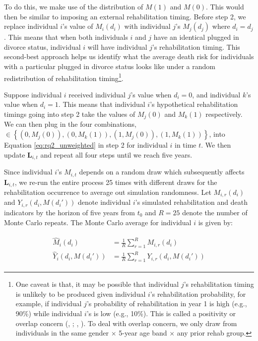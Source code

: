 \documentclass[a4paper,12pt]{article}
\theoremstyle{plain}
\theoremstyle{definition}
\theoremstyle{TheoremNum}
\theoremstyle{CorollaryNum}
\theoremstyle{PropositionNum}
\theoremstyle{TheoremNum}
\begin{document}
To do this, we make use of the distribution of $M(1)$ and $M(0)$. This would then be similar to imposing an external rehabilitation timing. Before step 2, we replace individual $i$'s value of $M_i(d_i)$ with individual $j$'s $M_j(d_j)$ where $d_i = d_j$. This means that when both individuals $i$ and $j$ have an identical plugged in divorce status, individual $i$ will have individual $j$'s rehabilitation timing. This second-best approach helps us identify what the average death risk for individuals with a particular plugged in divorce status looks like under a random redistribution of rehabilitation timing\footnote{One caveat is that, it may be possible that individual $j$'s rehabilitation timing is unlikely to be produced given individual $i$'s rehabilitation probability, for example, if individual $j$'s probability of rehabilitation in year 1 is high (e.g., 90\%) while individual $i$'s is low (e.g., 10\%). This is called a positivity or overlap concern (\citeauthor*{vanderweele2014effect}, \citeyear{vanderweele2014effect}; \citeauthor*{petersen2012diagnosing}, \citeyear{petersen2012diagnosing}). To deal with overlap concern, we only draw from individuals in the same gender $\times$ 5-year age band $\times$ any prior rehab group.}.

Suppose individual $i$ received individual $j$'s value when $d_i = 0$, and individual $k$'s value when $d_i = 1$. This means that individual $i$'s hypothetical rehabilitation timings going into step 2 take the values of $M_j(0)$ and $M_k(1)$ respectively. We can then plug in the four combinations, $\in \left\{(0,M_{j}(0)), (0,M_{k}(1)), (1, M_{j}(0)), (1, M_{k}(1))\right\}$, into Equation \ref{eq:rq2_unweighted} in step 2 for individual $i$ in time $t$. We then update $\mathbf{L}_{i,t}$  and repeat all four steps until we reach five years. 

Since individual $i$'s $M_{i,t}$ depends on a random draw which subsequently affects $\mathbf{L}_{i,t}$, we re-run the entire process 25 times with different draws for the rehabilitation occurrence to average out simulation randomness. Let $M_{i,r}(d_i)$ and $Y_{i,r}(d_i,M(d_i'))$ denote individual $i$'s simulated rehabilitation and death indicators by the horizon of five years from $t_0$ and $R=25$ denote the number of Monte Carlo repeats. The Monte Carlo average for individual $i$ is given by:

\begin{align}
\begin{split}
\hat{M}_{i}(d_i) & = \frac{1}{R} \sum_{r=1}^{R}M_{i,r}(d_i) \\
\hat{Y}_i(d_i,M(d_i')) & = \frac{1}{R} \sum_{r=1}^R Y_{i,r}(d_i,M(d_i'))
\end{split}
\tag{7}\label{eq:avg_within_individual}
\end{align}
\end{document}
